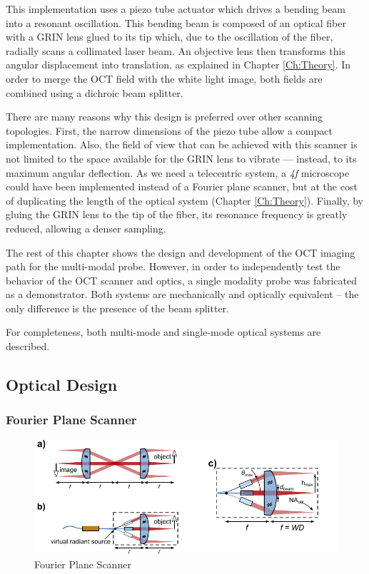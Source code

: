 This implementation uses a piezo tube actuator which drives a bending beam into a resonant oscillation. This bending beam is composed of an optical fiber with a GRIN lens glued to its tip which, due to the oscillation of the fiber, radially scans a collimated laser beam. An objective lens then transforms this angular displacement into translation, as explained in Chapter \ref{Ch:Theory}. In order to merge the OCT field with the white light image, both fields are combined using a dichroic beam splitter.

There are many reasons why this design is preferred over other scanning topologies. First, the narrow dimensions of the piezo tube allow a compact implementation. Also, the field of view that can be achieved with this scanner is not limited to the space available for the GRIN lens to vibrate --- instead, to its maximum angular deflection. As we need a telecentric system, a \textit{4f} microscope could have been implemented instead of a Fourier plane scanner, but at the cost of duplicating the length of the optical system (Chapter \ref{Ch:Theory}). Finally, by gluing the GRIN lens to the tip of the fiber, its resonance frequency is greatly reduced, allowing a denser sampling.


The rest of this chapter shows the design and development of the OCT imaging path for the multi-modal probe. However, in order to independently test the behavior of the OCT scanner and optics, a single modality probe was fabricated as a demonstrator. Both systems are mechanically and optically equivalent -- the only difference is the presence of the beam splitter. 

For completeness, both multi-mode and single-mode optical systems are described.



\newpage
\subsection{Optical Design}

\subsubsection*{Fourier Plane Scanner}



\begin{figure}[h!]\centering \includegraphics{figures/30_DesignSimulation/fps.pdf}
      \caption{Fourier Plane Scanner}
\end{figure}

